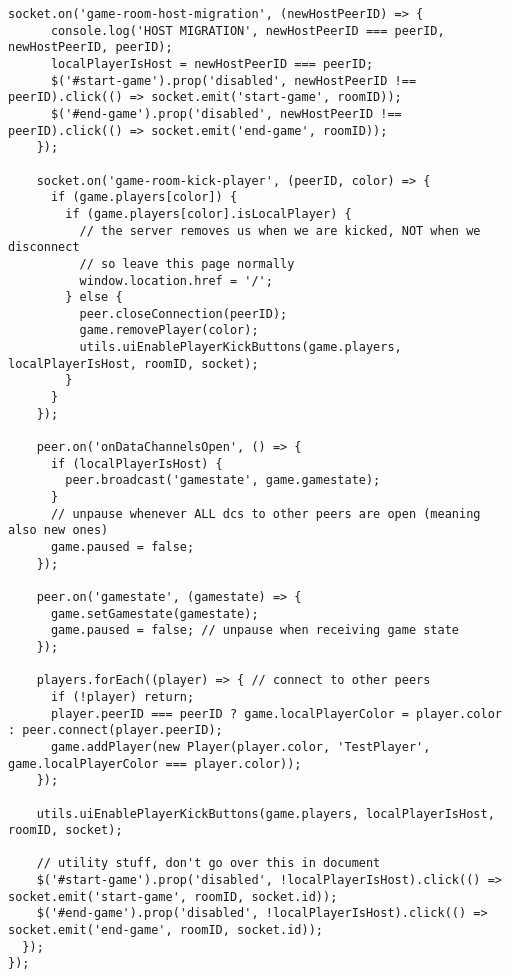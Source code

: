 \begin{singlespace}
\begin{lstlisting}[]
    socket.on('game-room-host-migration', (newHostPeerID) => {
      console.log('HOST MIGRATION', newHostPeerID === peerID, newHostPeerID, peerID);
      localPlayerIsHost = newHostPeerID === peerID;
      $('#start-game').prop('disabled', newHostPeerID !== peerID).click(() => socket.emit('start-game', roomID));
      $('#end-game').prop('disabled', newHostPeerID !== peerID).click(() => socket.emit('end-game', roomID));
    });

    socket.on('game-room-kick-player', (peerID, color) => {
      if (game.players[color]) {
        if (game.players[color].isLocalPlayer) {
          // the server removes us when we are kicked, NOT when we disconnect
          // so leave this page normally
          window.location.href = '/';
        } else {
          peer.closeConnection(peerID);
          game.removePlayer(color);
          utils.uiEnablePlayerKickButtons(game.players, localPlayerIsHost, roomID, socket);
        }
      }
    });

    peer.on('onDataChannelsOpen', () => {
      if (localPlayerIsHost) {
        peer.broadcast('gamestate', game.gamestate);
      }
      // unpause whenever ALL dcs to other peers are open (meaning also new ones)
      game.paused = false;
    });

    peer.on('gamestate', (gamestate) => {
      game.setGamestate(gamestate);
      game.paused = false; // unpause when receiving game state
    });

    players.forEach((player) => { // connect to other peers
      if (!player) return;
      player.peerID === peerID ? game.localPlayerColor = player.color : peer.connect(player.peerID);
      game.addPlayer(new Player(player.color, 'TestPlayer', game.localPlayerColor === player.color));
    });

    utils.uiEnablePlayerKickButtons(game.players, localPlayerIsHost, roomID, socket);

    // utility stuff, don't go over this in document
    $('#start-game').prop('disabled', !localPlayerIsHost).click(() => socket.emit('start-game', roomID, socket.id));
    $('#end-game').prop('disabled', !localPlayerIsHost).click(() => socket.emit('end-game', roomID, socket.id));
  });
});
\end{lstlisting}
\end{singlespace}